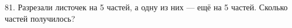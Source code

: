 81. Разрезали листочек на 5 частей, а одну из них --- ещё на 5 частей. Сколько частей получилось?\\
